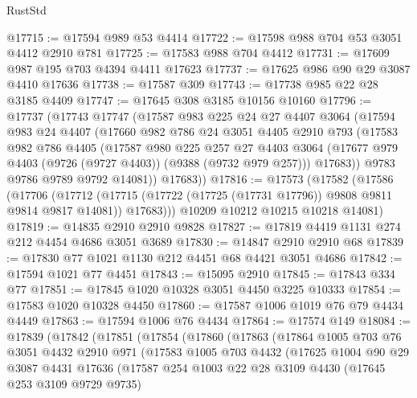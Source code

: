 \begin{lexlean}{RustStd}
\begin{coremodule}
@17715 := @17594 @989 @53 @4414
@17722 := @17598 @988 @704 @53 @3051 @4412 @2910 @781
@17725 := @17583 @988 @704 @4412
@17731 := @17609 @987 @195 @703 @4394 @4411 @17623
@17737 := @17625 @986 @90 @29 @3087 @4410 @17636
@17738 := @17587 @309
@17743 := @17738 @985 @22 @28 @3185 @4409
@17747 := @17645 @308 @3185 @10156 @10160
@17796 := @17737
    (@17743
      @17747
      (@17587
        @983
        @225
        @24
        @27
        @4407
        @3064
        (@17594
          @983
          @24
          @4407
          (@17660
            @982
            @786
            @24
            @3051
            @4405
            @2910
            @793
            (@17583
              @982
              @786
              @4405
              (@17587
                @980
                @225
                @257
                @27
                @4403
                @3064
                (@17677 @979 @4403 (@9726 (@9727 @4403)) (@9388 (@9732 @979 @257)))
                @17683))
            @9783
            @9786
            @9789
            @9792
            @14081))
        @17683))
@17816 := @17573
    (@17582
      (@17586
        (@17706
          (@17712
            (@17715 (@17722 (@17725 (@17731 @17796)) @9808 @9811 @9814 @9817 @14081))
            @17683)))
      @10209
      @10212
      @10215
      @10218
      @14081)
@17819 := @14835 @2910 @2910 @9828
@17827 := @17819 @4419 @1131 @274 @212 @4454 @4686 @3051 @3689
@17830 := @14847 @2910 @2910 @68
@17839 := @17830 @77 @1021 @1130 @212 @4451 @68 @4421 @3051 @4686
@17842 := @17594 @1021 @77 @4451
@17843 := @15095 @2910
@17845 := @17843 @334 @77
@17851 := @17845 @1020 @10328 @3051 @4450 @3225 @10333
@17854 := @17583 @1020 @10328 @4450
@17860 := @17587 @1006 @1019 @76 @79 @4434 @4449
@17863 := @17594 @1006 @76 @4434
@17864 := @17574 @149
@18084 := @17839
    (@17842
      (@17851
        (@17854
          (@17860
            (@17863
              (@17864
                @1005
                @703
                @76
                @3051
                @4432
                @2910
                @971
                (@17583
                  @1005
                  @703
                  @4432
                  (@17625
                    @1004
                    @90
                    @29
                    @3087
                    @4431
                    @17636
                    (@17587
                      @254
                      @1003
                      @22
                      @28
                      @3109
                      @4430
                      (@17645 @253 @3109 @9729 @9735)

\end{coremodule}
\end{lexlean}
